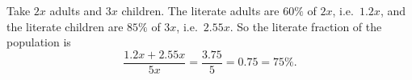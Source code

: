 Take $2x$ adults and $3x$ children. The literate adults are $60\%$ of $2x$, i.e.\ $1.2x$, and the literate children are $85\%$ of $3x$, i.e.\ $2.55x$. So the literate fraction of the population is
\[
\dfrac{1.2x+2.55x}{5x}=\dfrac{3.75}{5}=0.75=\boxed{75\%}.
\]

